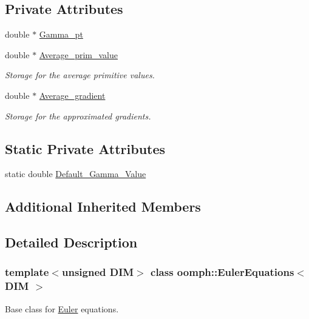 \subsection*{Private Attributes}
\begin{DoxyCompactItemize}
\item 
double $\ast$ \hyperlink{classoomph_1_1EulerEquations_a5dd362769200e19bd966d85c883beaa0}{Gamma\+\_\+pt}
\item 
double $\ast$ \hyperlink{classoomph_1_1EulerEquations_a2a0682d90bb2ae74a2e6cb1ef0e106db}{Average\+\_\+prim\+\_\+value}
\begin{DoxyCompactList}\small\item\em Storage for the average primitive values. \end{DoxyCompactList}\item 
double $\ast$ \hyperlink{classoomph_1_1EulerEquations_a716de77d64cecd2947b6f2cbf3effbda}{Average\+\_\+gradient}
\begin{DoxyCompactList}\small\item\em Storage for the approximated gradients. \end{DoxyCompactList}\end{DoxyCompactItemize}
\subsection*{Static Private Attributes}
\begin{DoxyCompactItemize}
\item 
static double \hyperlink{classoomph_1_1EulerEquations_ae5afff2a26816dd230386b3c1b15d7dd}{Default\+\_\+\+Gamma\+\_\+\+Value}
\end{DoxyCompactItemize}
\subsection*{Additional Inherited Members}


\subsection{Detailed Description}
\subsubsection*{template$<$unsigned D\+IM$>$\newline
class oomph\+::\+Euler\+Equations$<$ D\+I\+M $>$}

Base class for \hyperlink{classoomph_1_1Euler}{Euler} equations. 

